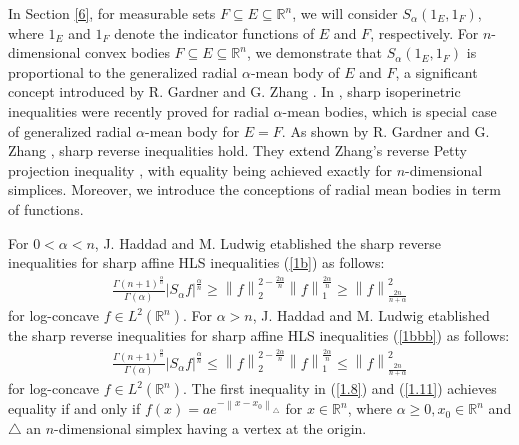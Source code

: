 \documentclass[preprint,12pt]{elsarticle}
\begin{document}
	In Section \ref{6}, for measurable sets $F\subseteq E\subseteq \mathbb{R}^n$, we will consider $S_{\alpha }\left ( 1_{E},1_{F}   \right )  $, where $1_{E}$ and $1_{F}$ denote the indicator functions of $E$ and $F$, respectively. For $n$-dimensional convex bodies $F\subseteq E\subseteq \mathbb{R}^n$, we demonstrate that $S_{\alpha }\left ( 1_{E},1_{F}   \right ) $ is proportional to the  generalized radial $\alpha$-mean body of $E$ and $F$, a significant concept introduced by R. Gardner and G. Zhang \cite[p.524]{GZ98}.
	In \cite{JM22-}, sharp isoperinetric inequalities were recently proved for radial $\alpha$-mean bodies, which is special case of generalized radial $\alpha$-mean body for $E=F$. As shown by R. Gardner and G. Zhang \cite{GZ98}, sharp reverse inequalities hold. They extend Zhang's reverse Petty projection inequality \cite{GZ91}, with equality being achieved exactly for $n$-dimensional simplices. Moreover, we introduce the
	conceptions of radial mean bodies in term of functions.
	
	For $0< \alpha <n$, J. Haddad and M. Ludwig \cite[Theorem 2]{JM22} etablished the sharp reverse inequalities for sharp affine HLS inequalities (\ref{1b}) as follows:
	\begin{eqnarray}\label{1.8}
		\frac{\Gamma \left ( n+1 \right )^{\frac{\alpha }{n} }  }{\Gamma \left ( \alpha  \right ) }\left | S_{\alpha } f   \right |^{\frac{\alpha }{n} }\ge   {\left \| f \right \|}_{2} ^{2-\frac{2\alpha }{n} }{\left \| f \right \|}_{1} ^{\frac{2\alpha }{n} }
		\ge {\left \| f \right \|}_{\frac{2n }{n+\alpha}}^{2}
	\end{eqnarray}
	for log-concave $f \in L^{2}\left ( \mathbb{R}^n  \right )$. For $\alpha > n$,
	J. Haddad and M. Ludwig \cite[Theorem 15]{JM22} etablished the sharp reverse inequalities for sharp affine HLS inequalities (\ref{1bbb}) as follows:
	\begin{eqnarray}\label{1.11}
		\frac{\Gamma \left ( n+1 \right )^{\frac{\alpha }{n} }  }{\Gamma \left ( \alpha  \right ) }\left | S_{\alpha } f   \right |^{\frac{\alpha }{n} }\le   {\left \| f \right \|}_{2} ^{2-\frac{2\alpha }{n} }{\left \| f \right \|}_{1} ^{\frac{2\alpha }{n} }
		\le {\left \| f \right \|}_{\frac{2n }{n+\alpha}}^{2}
	\end{eqnarray}
	for log-concave $f \in L^{2}\left ( \mathbb{R}^n  \right )$.
	The first inequality in (\ref{1.8}) and (\ref{1.11}) achieves equality if and only if $f\left ( x \right )=ae^{-\left \| x-x_{0}  \right \|_{\bigtriangleup }  }$ for $x\in \mathbb{R}^n  $, where $\alpha \ge 0,x_{0}\in \mathbb{R}^n $ and $\bigtriangleup $ an $n$-dimensional simplex having a vertex at the origin. 
	
\end{document}
